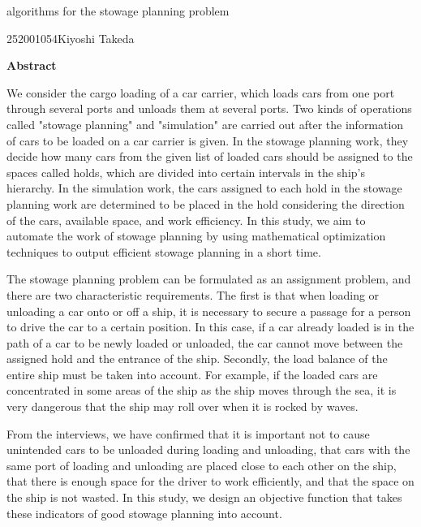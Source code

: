 \newpage
\begin{center}{\LARGE algorithms for the stowage planning problem }\\[0.5cm]
\end{center}
\hfill {\large 252001054\qquad Kiyoshi Takeda}\\[0.5cm]
\begin{center}
{\large \bf Abstract}\\
\end{center}

We consider the cargo loading of a car carrier, which loads cars from one port through several ports and unloads them at several ports.
Two kinds of operations called "stowage planning" and "simulation" are carried out after the information of cars to be loaded on a car carrier is given.
In the stowage planning work, they decide how many cars from the given list of loaded cars should be assigned to the spaces called holds, which are divided into certain intervals in the ship's hierarchy.
In the simulation work, the cars assigned to each hold in the stowage planning work are determined to be placed in the hold considering the direction of the cars, available space, and work efficiency.
In this study, we aim to automate the work of stowage planning by using mathematical optimization techniques to output efficient stowage planning in a short time.

The stowage planning problem can be formulated as an assignment problem, and there are two characteristic requirements.
The first is that when loading or unloading a car onto or off a ship, it is necessary to secure a passage for a person to drive the car to a certain position.
In this case, if a car already loaded is in the path of a car to be newly loaded or unloaded, the car cannot move between the assigned hold and the entrance of the ship.
Secondly, the load balance of the entire ship must be taken into account.
For example, if the loaded cars are concentrated in some areas of the ship as the ship moves through the sea, it is very dangerous that the ship may roll over when it is rocked by waves.

From the interviews, we have confirmed that it is important not to cause unintended cars to be unloaded during loading and unloading, that cars with the same port of loading and unloading are placed close to each other on the ship, that there is enough space for the driver to work efficiently, and that the space on the ship is not wasted. In this study, we design an objective function that takes these indicators of good stowage planning into account.

